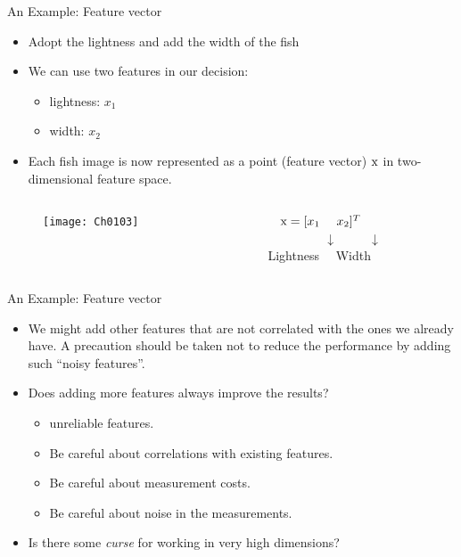 \begin{frame}{An Example: Feature vector}
\begin{itemize}
\item Adopt the lightness and add the width of the fish
\item We can use two features in our decision:
\begin{itemize}
\item lightness: $x_1$
\item width: $x_2$
\end{itemize}
\item Each fish image is now represented as a point ({\color{mycolor2}feature vector}) ${\rm x}$ in two-dimensional  {\color{mycolor2}feature space}.
\end{itemize}
\vspace{-0.5cm}
\begin{columns}
\begin{column}{6cm}
\begin{figure}
\texttt{[image: Ch0103]}
\end{figure}
\end{column}
\begin{column}{4cm}
$~~~{\rm x}=[x_1~~~~x_2]^T$\\
~~~~~~~~~$\downarrow$~~~~~$\downarrow$\\
Lightness~~ Width
\end{column}
\end{columns}
\end{frame}

\begin{frame}{An Example: Feature vector}
\begin{itemize}
\setlength{\itemsep}{12pt}
\item We might add other features that are not correlated with the ones we already have. A precaution should be taken not to reduce the performance by adding such ``noisy features''.
\item Does adding more features always improve the results?
\begin{itemize}
\item unreliable features.
\item Be careful about correlations with existing features.
\item Be careful about measurement costs.
\item Be careful about noise in the measurements.
\end{itemize} 
\item Is there some \textit{\color{mycolor2}curse} for working in very high dimensions?
\end{itemize}
\end{frame}

